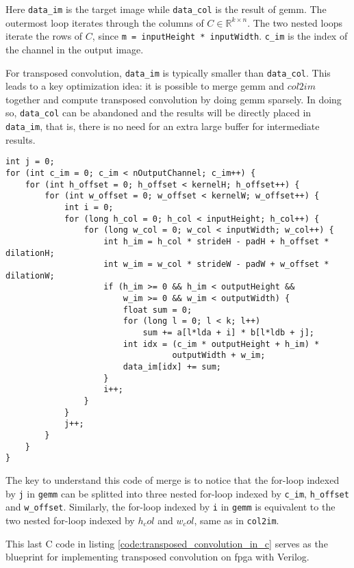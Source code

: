Here \texttt{data_im} is the target image while \texttt{data_col} is the result of \gls{gemm}.
The outermost loop iterates through the columns of $C \in \mathbb{R}^{k \times n}$. The two nested loops
iterate the rows of $C$, since \texttt{m = inputHeight * inputWidth}. \texttt{c_im} is the
index of the channel in the output image. %

For transposed convolution, \texttt{data_im} is typically smaller than
\texttt{data_col}. This leads to a key optimization idea: it is possible to merge \gls{gemm} and
$col2im$ together and compute transposed convolution by doing \gls{gemm} sparsely. In doing so,
\texttt{data_col} can be abandoned and the results will be directly placed in \texttt{data_im},
that is, there is no need for an extra large buffer for intermediate results.

\begin{code}
\begin{verbatim}
int j = 0;
for (int c_im = 0; c_im < nOutputChannel; c_im++) {
    for (int h_offset = 0; h_offset < kernelH; h_offset++) {
        for (int w_offset = 0; w_offset < kernelW; w_offset++) {
            int i = 0;
            for (long h_col = 0; h_col < inputHeight; h_col++) {
                for (long w_col = 0; w_col < inputWidth; w_col++) {
                    int h_im = h_col * strideH - padH + h_offset * dilationH;
                    int w_im = w_col * strideW - padW + w_offset * dilationW;
                    if (h_im >= 0 && h_im < outputHeight &&
                        w_im >= 0 && w_im < outputWidth) {
                        float sum = 0;
                        for (long l = 0; l < k; l++)
                            sum += a[l*lda + i] * b[l*ldb + j];
                        int idx = (c_im * outputHeight + h_im) *
                                  outputWidth + w_im;
                        data_im[idx] += sum;
                    }
                    i++;
                }
            }
            j++;
        }
    }
}
\end{verbatim}
\label{code:transposed_convolution_in_c}
\end{code}

The key to understand this code of merge is to notice that the for-loop indexed by \texttt{j} in
\texttt{gemm} can be splitted into three nested for-loop indexed by \texttt{c_im}, \texttt{h_offset} and \texttt{w_offset}.
Similarly, the for-loop indexed by \texttt{i} in \texttt{gemm} is equivalent to the two
nested for-loop indexed by $h_col$ and $w_col$, same as in \texttt{col2im}.

This last C code in listing \ref{code:transposed_convolution_in_c} serves as the blueprint for implementing
transposed convolution on \gls{fpga} with Verilog.

\clearpage %
